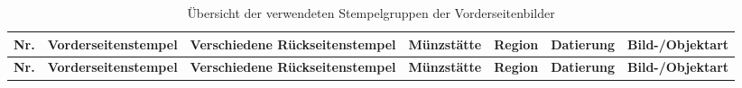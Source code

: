 
\glsresetall %


\begin{landscape}

\small

\begin{longtable}{
    |c|
    |c|
    |c|
    |p{2.5cm}|
    |p{2.2cm}|
    |p{2.5cm}|
    |p{2.5cm}|
}
\caption{Übersicht der verwendeten Stempelgruppen der Vorderseitenbilder}
\label{tab:stempelgruppen} \\

\hline
\textbf{Nr.} &
\textbf{Vorderseiten\-stempel} &
\textbf{Verschiedene Rückseiten\-stempel} &
\textbf{Münzstätte} &
\textbf{Region} &
\textbf{Datierung} &
\textbf{Bild-/Objektart} \\
\hline
\endfirsthead

\hline
\textbf{Nr.} &
\textbf{Vorderseiten\-stempel} &
\textbf{Verschiedene Rückseiten\-stempel} &
\textbf{Münzstätte} &
\textbf{Region} &
\textbf{Datierung} &
\textbf{Bild-/Objektart} \\
\hline
\endhead


\end{longtable}
\end{landscape}

